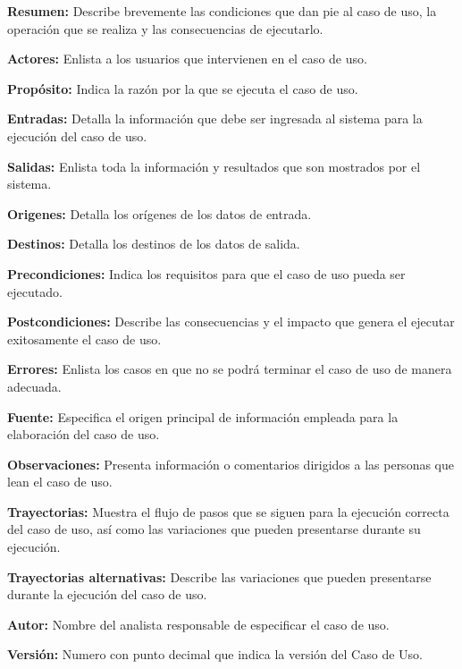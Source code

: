 \begin{Citemize}
	\item {\bf Resumen:} Describe brevemente las condiciones que dan pie al caso de uso, la operación que se realiza y las consecuencias de ejecutarlo.
	\item {\bf Actores:} Enlista a los usuarios que intervienen en el caso de uso.
	\item {\bf Propósito:} Indica la razón por la que se ejecuta el caso de uso.
	\item {\bf Entradas:} Detalla la información que debe ser ingresada al sistema para la ejecución del caso de uso.
	\item {\bf Salidas:} Enlista toda la información y resultados que son mostrados por el sistema.
	\item {\bf Origenes:} Detalla los orígenes de los datos de entrada.
	\item {\bf Destinos:} Detalla los destinos de los datos de salida.
	\item {\bf Precondiciones:} Indica los requisitos para que el caso de uso pueda ser ejecutado.
	\item {\bf Postcondiciones:} Describe las consecuencias y el impacto que genera el ejecutar exitosamente el caso de uso.
	\item {\bf Errores:} Enlista los casos en que no se podrá terminar el caso de uso de manera adecuada.
	\item {\bf Fuente:} Especifica el origen principal de información empleada para la elaboración del caso de uso.
	\item {\bf Observaciones:} Presenta información o comentarios dirigidos a las personas que lean el caso de uso.
	\item {\bf Trayectorias:} Muestra el flujo de pasos que se siguen para la ejecución correcta del caso de uso, así como las variaciones que pueden presentarse durante su ejecución.
	\item {\bf Trayectorias alternativas:} Describe las variaciones que pueden presentarse durante la ejecución del caso de uso.
	\item {\bf Autor:} Nombre del analista responsable de especificar el caso de uso.
	\item {\bf Versión:} Numero con punto decimal que indica la versión del Caso de Uso.

\end{Citemize}
